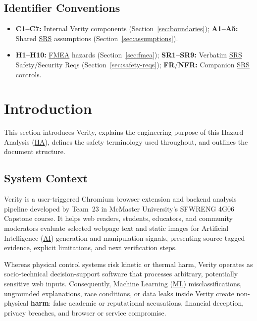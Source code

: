 \documentclass[11pt]{article}
\newcommand{\AI}{\hyperlink{ha-acr-ai}{AI}}
\newcommand{\FMEA}{\hyperlink{ha-acr-fmea}{FMEA}}
\newcommand{\HA}{\hyperlink{ha-acr-ha}{HA}}
\newcommand{\ML}{\hyperlink{ha-acr-ml}{ML}}
\newcommand{\SRS}{\hyperlink{ha-acr-srs}{SRS}}
\begin{document}
\subsection*{Identifier Conventions}
\begin{itemize}[leftmargin=*, noitemsep]
    \item \textbf{C1--C7:} Internal Verity components (Section~\ref{sec:boundaries}); \textbf{A1--A5:} Shared \SRS{} assumptions (Section~\ref{sec:assumptions}).
    \item \textbf{H1--H10:} \FMEA{} hazards (Section~\ref{sec:fmea}); \textbf{SR1--SR9:} Verbatim \SRS{} Safety/Security Reqs (Section~\ref{sec:safety-reqs}); \textbf{FR}/\textbf{NFR:} Companion \SRS{} controls.
\end{itemize}

\newpage
{}

\section{Introduction}\label{sec:intro}

This section introduces Verity, explains the engineering purpose of this Hazard Analysis (\HA{}), defines the safety terminology used throughout, and outlines the document structure.

\subsection{System Context}
Verity is a user-triggered Chromium browser extension and backend analysis pipeline developed by Team~23 in McMaster University's SFWRENG 4G06 Capstone course. It helps web readers, students, educators, and community moderators evaluate selected webpage text and static images for Artificial Intelligence (\AI{}) generation and manipulation signals, presenting source-tagged evidence, explicit limitations, and next verification steps.

Whereas physical control systems risk kinetic or thermal harm, Verity operates as socio-technical decision-support software that processes arbitrary, potentially sensitive web inputs. Consequently, Machine Learning (\ML{}) misclassifications, ungrounded explanations, race conditions, or data leaks inside Verity create non-physical \textbf{harm}: false academic or reputational accusations, financial deception, privacy breaches, and browser or service compromise.
\end{document}
